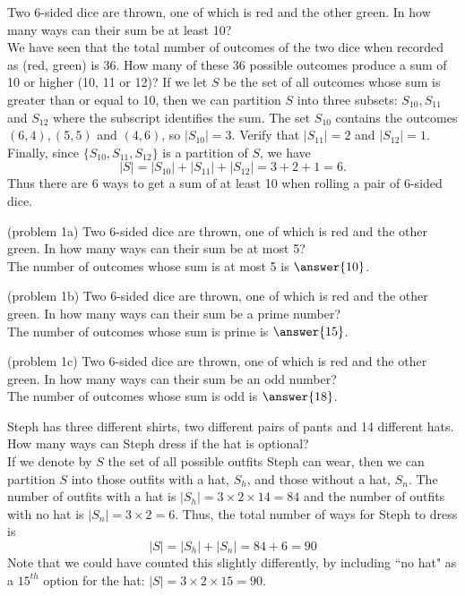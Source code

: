 \documentclass[handout]{ximera}
\begin{document}
\begin{example}[example 1]
Two 6-sided dice are thrown, one of which is red and the other green.  
In how many ways can their sum be at least 10?\\
We have seen that the total number of outcomes of the two dice when 
recorded as (red, green) is 36. How many of these 36 possible outcomes produce a 
sum of 10 or higher (10, 11 or 12)? 
If we let $S$ be the set of all outcomes whose sum is greater than 
or equal to 10, then we can partition $S$ into three 
subsets: $S_{10}, S_{11}$ and $S_{12}$
where the subscript identifies the sum. 
The set $S_{10}$ contains the outcomes $(6,4), (5,5)$ and $(4,6)$, 
so $|S_{10}| =3$. Verify that $|S_{11}| =2$ and $|S_{12}| =1$.\\
Finally, since $\{S_{10}, S_{11}, S_{12}\}$ is a partition of $S$, we have
\[
|S| = |S_{10}| +|S_{11}| +|S_{12}| = 3 + 2 + 1 = 6.
\]
Thus there are 6 ways to get a sum of at least 10 when rolling a pair of 6-sided dice.
\end{example}

\begin{problem}(problem 1a)
Two 6-sided dice are thrown, one of which is red and the other green.  
In how many ways can their sum be at most 5?\\
The number of outcomes whose sum is at most 5 is $\answer{10}$.
\end{problem}

\begin{problem}(problem 1b)
Two 6-sided dice are thrown, one of which is red and the other green.  
In how many ways can their sum be a prime number?\\
The number of outcomes whose sum is prime is $\answer{15}$.
\end{problem}

\begin{problem}(problem 1c)
Two 6-sided dice are thrown, one of which is red and the other green.  
In how many ways can their sum be an odd number?\\
The number of outcomes whose sum is odd is $\answer{18}$.
\end{problem}


\begin{example}[example 2] Steph has three different shirts, 
two different pairs of pants and 14 different hats. 
How many ways can Steph dress if the hat is optional?\\
If we denote by $S$ the set of all possible outfits Steph can wear, 
then we can partition $S$ into those outfits with a hat, $S_h$, 
and those without a hat, $S_{n}$.
The number of outfits with a hat is $|S_h| = 3 \times 2 \times 14 = 84$ and 
the number of outfits with no hat is $|S_n| = 3\times 2 = 6$. 
Thus, the total number of ways for Steph to dress is 
\[
|S| = |S_h| + |S_{n}| = 84 + 6 = 90
\]
Note that we could have counted this slightly 
differently, by including ``no hat" as a $15^{th}$ option 
for the hat: $|S| = 3 \times 2 \times 15 = 90$.
\end{example}
\end{document}
